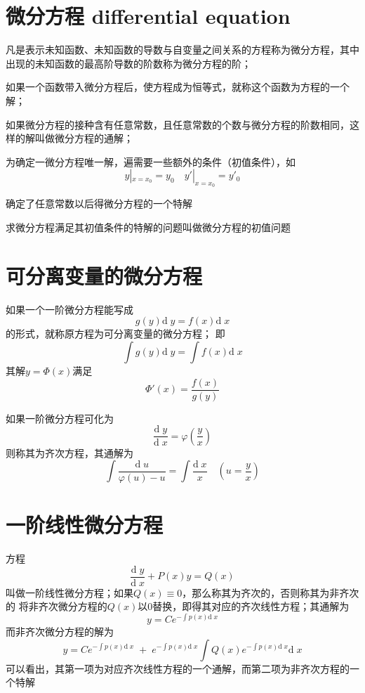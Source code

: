 \documentclass[UTF8]{ctexart}
\newcommand{\dif}[1]{\text{d}\;\!#1}
\begin{document}
\section*{微分方程 differential equation}

\bigskip

凡是表示未知函数、未知函数的导数与自变量之间关系的方程称为微分方程，其中出现的未知函数的最高阶导数的阶数称为微分方程的阶；

如果一个函数带入微分方程后，使方程成为恒等式，就称这个函数为方程的一个解；

如果微分方程的接种含有任意常数，且任意常数的个数与微分方程的阶数相同，这样的解叫做微分方程的通解；

为确定一微分方程唯一解，遍需要一些额外的条件（初值条件），如
\[y|_{x=x_0}=y_0\quad y'|_{x=x_0}=y'_0\]

确定了任意常数以后得微分方程的一个特解

求微分方程满足其初值条件的特解的问题叫做微分方程的初值问题
\bigskip
\bigskip

\section*{可分离变量的微分方程}

\bigskip

如果一个一阶微分方程能写成
\[ g(y)\dif{y}=f(x)\dif{x} \]
的形式，就称原方程为可分离变量的微分方程；
即
\[ \int g(y)\dif{y}=\int f(x)\dif{x} \]
其解$y=\Phi(x)$满足
\[\Phi'(x)=\frac{f(x)}{g(y)}\]

\bigskip

如果一阶微分方程可化为
\[\frac{\dif{y}}{\dif{x}}=\varphi(\frac{y}{x})\]
则称其为齐次方程，其通解为
\[ \int\frac{\dif{u}}{\varphi(u)-u}=\int\frac{\dif{x}}{x} \quad(u=\frac{y}{x})\]
\bigskip
\bigskip

\section*{一阶线性微分方程}

\bigskip

方程
\[ \frac{\dif{y}}{\dif{x}}+P(x)y=Q(x) \]
叫做一阶线性微分方程；如果$Q(x)\equiv0$，那么称其为齐次的，否则称其为非齐次的
将非齐次微分方程的$Q(x)$以$0$替换，即得其对应的齐次线性方程；其通解为
\[ y=Ce^{-\int p(x)\dif{x}} \]
而非齐次微分方程的解为
\[y=Ce^{-\int p(x)\dif{x}}\;+\;e^{-\int p(x)\dif{x}}\int Q(x)e^{-\int p(x)\dif{x}}\dif{x}\]
可以看出，其第一项为对应齐次线性方程的一个通解，而第二项为非齐次方程的一个特解
\end{document}
